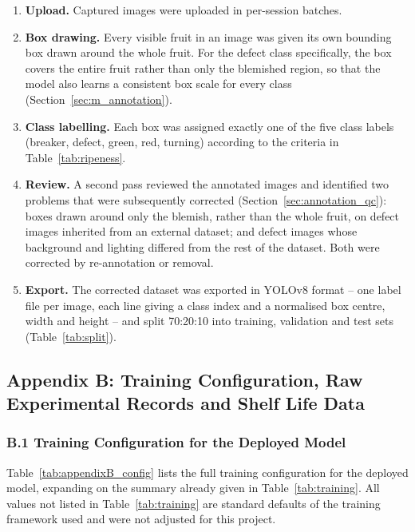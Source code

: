 \begin{enumerate}
    \item \textbf{Upload.} Captured images were uploaded in per-session batches.
    \item \textbf{Box drawing.} Every visible fruit in an image was given its own bounding box drawn around the whole fruit. For the defect class specifically, the box covers the entire fruit rather than only the blemished region, so that the model also learns a consistent box scale for every class (Section~\ref{sec:m_annotation}).
    \item \textbf{Class labelling.} Each box was assigned exactly one of the five class labels (breaker, defect, green, red, turning) according to the criteria in Table~\ref{tab:ripeness}.
    \item \textbf{Review.} A second pass reviewed the annotated images and identified two problems that were subsequently corrected (Section~\ref{sec:annotation_qc}): boxes drawn around only the blemish, rather than the whole fruit, on defect images inherited from an external dataset; and defect images whose background and lighting differed from the rest of the dataset. Both were corrected by re-annotation or removal.
    \item \textbf{Export.} The corrected dataset was exported in YOLOv8 format -- one label file per image, each line giving a class index and a normalised box centre, width and height -- and split 70:20:10 into training, validation and test sets (Table~\ref{tab:split}).
\end{enumerate}

\subsection*{Appendix B: Training Configuration, Raw Experimental Records and Shelf Life Data}

\subsubsection*{B.1 Training Configuration for the Deployed Model}

Table~\ref{tab:appendixB_config} lists the full training configuration for the deployed model, expanding on the summary already given in Table~\ref{tab:training}. All values not listed in Table~\ref{tab:training} are standard defaults of the training framework used and were not adjusted for this project.

